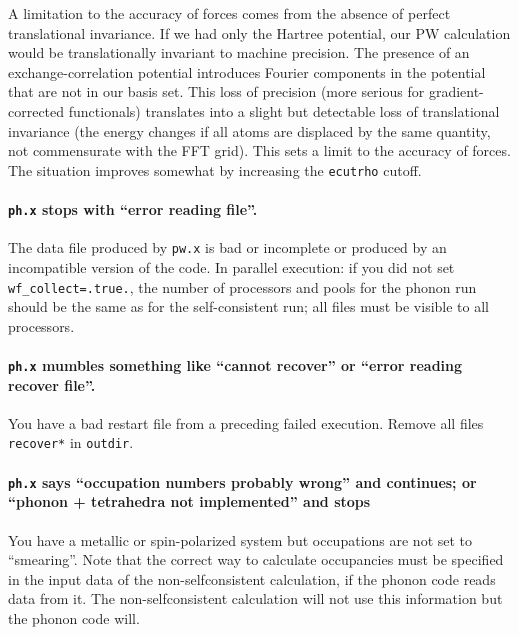 \documentclass[12pt,a4paper]{article}
\begin{document}
A limitation to the accuracy of forces comes from the absence of
perfect translational invariance.  If we had only the Hartree
potential, our PW calculation would be translationally invariant to
machine precision.  The presence of an exchange-correlation potential
introduces Fourier components in the potential that are not in our
basis set.  This loss of precision (more serious for
gradient-corrected functionals) translates into a slight but
detectable loss of translational invariance (the energy changes if all
atoms are displaced by the same quantity, not commensurate with the
FFT grid).  This sets a limit to the accuracy of forces.  The
situation improves somewhat by increasing the \texttt{ecutrho} cutoff.

\paragraph{\texttt{ph.x} stops with ``error reading file''.}

The data file produced by \texttt{pw.x} is bad or incomplete or
produced by an incompatible version of the code.
In parallel execution: if you did not set \texttt{wf\_collect=.true.},
the number of processors and pools for the phonon run should be the 
same as for the self-consistent run; all files must be visible to all 
processors.

\paragraph{\texttt{ph.x} mumbles something like ``cannot recover'' or
           ``error reading recover file''.}

You have a bad restart file from a preceding failed execution.
Remove all files \texttt{recover*} in \texttt{outdir}.

\paragraph{\texttt{ph.x} says ``occupation numbers probably wrong''
and continues; or ``phonon + tetrahedra not implemented'' and stops}

You have a metallic or spin-polarized system but occupations are not 
set to ``smearing''. Note that the correct way to calculate occupancies 
must be specified in the input data of the non-selfconsistent 
calculation, if the phonon code reads data from it. The non-selfconsistent 
calculation will not use this information but the phonon code will.
\end{document}
